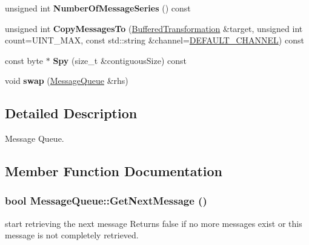\begin{DoxyCompactItemize}
\item 
\hypertarget{class_message_queue_ac7208eb1374fd4689d61947ffb161352}{
unsigned int {\bfseries NumberOfMessageSeries} () const }
\label{class_message_queue_ac7208eb1374fd4689d61947ffb161352}

\item 
\hypertarget{class_message_queue_a490911bea66c6b2872f0ab06f0fca255}{
unsigned int {\bfseries CopyMessagesTo} (\hyperlink{class_buffered_transformation}{BufferedTransformation} \&target, unsigned int count=UINT\_\-MAX, const std::string \&channel=\hyperlink{cryptlib_8h_a6f1917f54ea8c2a45de6e08c5087c8de}{DEFAULT\_\-CHANNEL}) const }
\label{class_message_queue_a490911bea66c6b2872f0ab06f0fca255}

\item 
\hypertarget{class_message_queue_a14f7e2253bc1a2fde1f9ec77a93a213e}{
const byte $\ast$ {\bfseries Spy} (size\_\-t \&contiguousSize) const }
\label{class_message_queue_a14f7e2253bc1a2fde1f9ec77a93a213e}

\item 
\hypertarget{class_message_queue_a0cf7618db89d28cb81aa7ddfc29b3d85}{
void {\bfseries swap} (\hyperlink{class_message_queue}{MessageQueue} \&rhs)}
\label{class_message_queue_a0cf7618db89d28cb81aa7ddfc29b3d85}

\end{DoxyCompactItemize}


\subsection{Detailed Description}
Message Queue. 

\subsection{Member Function Documentation}
\hypertarget{class_message_queue_a540da279953a13541a65c271888e27b7}{
\subsubsection[{GetNextMessage}]{\setlength{\rightskip}{0pt plus 5cm}bool MessageQueue::GetNextMessage ()}}
\label{class_message_queue_a540da279953a13541a65c271888e27b7}


start retrieving the next message Returns false if no more messages exist or this message is not completely retrieved. 

